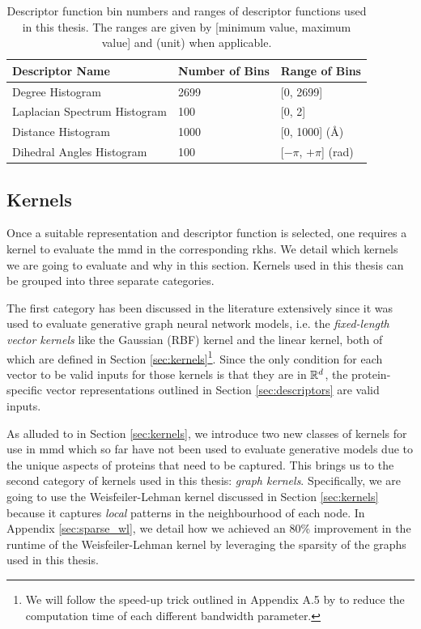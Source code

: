 \begin{table}
  \centering
  \begin{tabular}{lll}
    \toprule
    \textbf{Descriptor Name} & \textbf{Number of Bins} & \textbf{Range of Bins} \\
    \midrule
    Degree Histogram & 2699 & [0, 2699] \\
    Laplacian Spectrum Histogram & 100 & [0, 2] \\
    Distance Histogram & 1000 & [0, 1000] (\si{\angstrom}) \\
    Dihedral Angles Histogram & 100 & [$-\pi$, $+\pi$] (rad) \\
    \bottomrule
  \end{tabular}
  \caption[Descriptor function bin numbers and ranges of descriptor functions
  used in this thesis.]{Descriptor function bin numbers and ranges of descriptor functions
    used in this thesis. The ranges are given by
    [minimum value, maximum value] and (unit) when applicable.}
  \label{tab:descriptor_function_setup}
\end{table}


\subsection{Kernels}\label{sec:methods_kernels}
Once a suitable representation and descriptor function is selected, one requires
a kernel to evaluate the \acrshort{mmd} in the corresponding \acrshort{rkhs}. We
detail which kernels we are going to evaluate and why in this section. Kernels
used in this thesis can be grouped into three separate categories.

The first category has been discussed in the literature extensively since it was
used to evaluate generative graph neural network models, i.e. the
\emph{fixed-length vector kernels} like the Gaussian (RBF) kernel and the linear
kernel, both of which are defined in Section \ref{sec:kernels}\footnote{We will
  follow the speed-up trick outlined in Appendix A.5 by \cite{obray2022evaluation}
  to reduce the computation time of each different bandwidth parameter.}. Since the only
condition for each vector to be valid inputs for those kernels is that they are
in $\mathbb{R}^d$, the protein-specific vector representations outlined in Section
\ref{sec:descriptors} are valid inputs.

As alluded to in Section \ref{sec:kernels}, we introduce two new classes of
kernels for use in \acrshort{mmd} which so far have not been used to evaluate generative
models due to the unique aspects of proteins that need to be captured. This
brings us to the second category of kernels used in this thesis: \emph{graph kernels}.
Specifically, we are going to use the Weisfeiler-Lehman kernel discussed in
Section \ref{sec:kernels} because it captures \emph{local} patterns in the
neighbourhood of each node. In Appendix \ref{sec:sparse_wl}, we detail how we
achieved an 80\% improvement in the runtime of the Weisfeiler-Lehman kernel by
leveraging the sparsity of the graphs used in this thesis.

